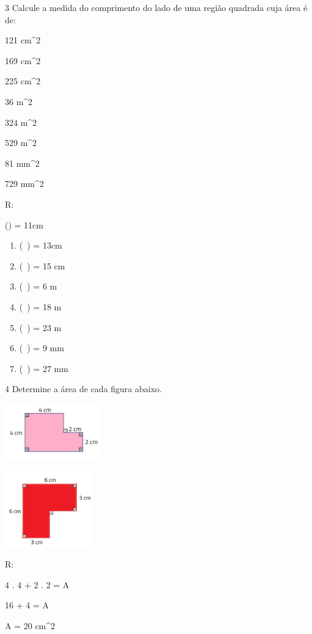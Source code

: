 {\num{3} Calcule a medida do comprimento do lado de uma região quadrada cuja
área é de:
\item 121 cm^2
\item 169 cm^2
\item 225 cm^2
\item 36 m^2
\item 324 m^2
\item 529 m^2
\item 81 mm^2
\item 729 mm^2

R:
\item () = 11cm

\begin{enumerate}
\def\labelenumi{\alph{enumi})}
\setcounter{enumi}{1}
\item
  (\ ) = 13cm
\item
  (\ ) = 15 cm
\item
  (\ ) = 6 m
\item
  (\ ) = 18 m
\item
  (\ ) = 23 m
\item
  (\ ) = 9 mm
\item
  (\ ) = 27 mm
\end{enumerate}

\num{4} Determine a área de cada figura abaixo.
\item
\includegraphics[width=1.65in,height=0.96458in]{./imgSAEB_8_MAT/media/image43.png}
\item
\includegraphics[width=1.50833in,height=1.28681in]{./imgSAEB_8_MAT/media/image44.png}

R:
\item

4 . 4 + 2 . 2 = A

16 + 4 = A

A = 20 cm^2
\item

}
